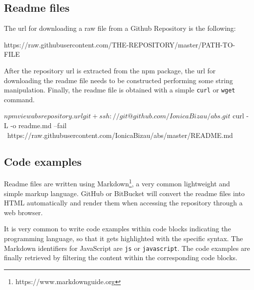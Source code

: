\subsection{Readme files}
The url for downloading a raw file from a Github Repository is the following:

\begin{bashinline}
https://raw.githubusercontent.com/THE-REPOSITORY/master/PATH-TO-FILE
\end{bashinline}

After the repository url is extracted from the npm package, the url for downloading the readme file needs to be constructed performing some string manipulation. Finally, the readme file is obtained with a simple \texttt{curl} or \texttt{wget} command.

\begin{bashinline}
$ npm view abs repository.url
git+ssh://git@github.com/IonicaBizau/abs.git

$ curl -L -o readme.md --fail \
    https://raw.githubusercontent.com/IonicaBizau/abs/master/README.md
\end{bashinline}

\subsection{Code examples}
Readme files are written using Markdown\footnote{https://www.markdownguide.org}, a very common lightweight and simple markup language. GitHub or BitBucket will convert the readme files into HTML automatically and render them when accessing the repository through a web browser.

It is very common to write code examples within code blocks indicating the programming language, so that it gets highlighted with the specific syntax. The Markdown identifiers for JavaScript are \texttt{js} or \texttt{javascript}. The code examples are finally retrieved by filtering the content within the corresponding code blocks.


